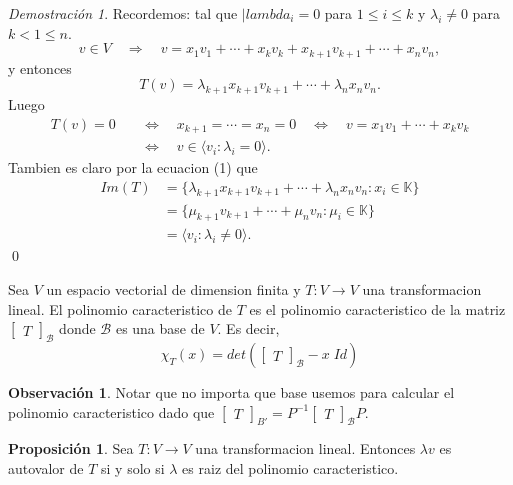 \documentclass{article}
\theoremstyle{definition}
\theoremstyle{definition}
\newtheorem*{obs}{Observación}
\newtheorem{prop}[teo]{Proposición}
\theoremstyle{remark}
\newtheorem*{demo}{Demostración}
\begin{document}
\begin{demo}
  Recordemos: tal que $|lambda_i = 0$ para $1 \leq i \leq k $ y $\lambda_i \neq 0$ para $ k < 1 \leq n$. \[
    v \in V \quad \Rightarrow \quad v=x_1 v_1 + \cdots + x_k v_k + x_{k+1} v_{k+1}+ \cdots + x_n v_n ,
  \]
  y entonces \begin{equation}
    T(v)=\lambda_{k+1}x_{k+1}v_{k+1}+\cdots + \lambda_{n}x_nv_n. \tag{1}
  \end{equation}
  Luego \[
    \begin{aligned}
      T(v)=0 \quad &\Leftrightarrow \quad x_{k+1} = \cdots = x_n = 0 \quad \Leftrightarrow \quad v=x_1 v_1 + \cdots + x_kv_k \\
                   &\Leftrightarrow \quad v \in \langle v_i : \lambda_i = 0 \rangle .
    \end{aligned}
  \]
  Tambien es claro por la ecuacion (1) que \[
    \begin{aligned}
      Im(T) &= \{\lambda_{k+1}x_{k+1}v_{k+1}+ \cdots + \lambda_{n}x_{n}v_n : x_i \in \mathbb{K}\} \\ &= \{\mu_{k+1}v_{k+1}+\cdots + \mu_nv_n : \mu_i \in \mathbb{K}\} \\
            &= \langle v_i : \lambda_i \neq 0 \rangle .
    \end{aligned}
  \]
  \qed
\end{demo}
\begin{defi}
  Sea $V$ un espacio vectorial de dimension finita y $T : V \to V$ una transformacion lineal. El polinomio caracteristico de $T$ es el polinomio caracteristico de la matriz $\begin{bmatrix}T\end{bmatrix}_{\mathcal{B}}$ donde $\mathcal{B}$ es una base de $V$. Es decir, \[
  \chi_{T}(x)=det\left(\begin{bmatrix}T\end{bmatrix}_{\mathcal{B}}-x \; Id\right)
\]
\end{defi}
\begin{obs}
  Notar que no importa que base usemos para calcular el polinomio caracteristico dado que $\begin{bmatrix}T\end{bmatrix}_{B'}=P^{-1}\begin{bmatrix}T\end{bmatrix}_{\mathcal{B}}P$.
\end{obs}
\begin{prop}
  Sea $T : V \to V$ una transformacion lineal. Entonces $\lambda v $ es autovalor de $T$ si y solo si $\lambda$ es raiz del polinomio caracteristico.
\end{prop}
\end{document}
